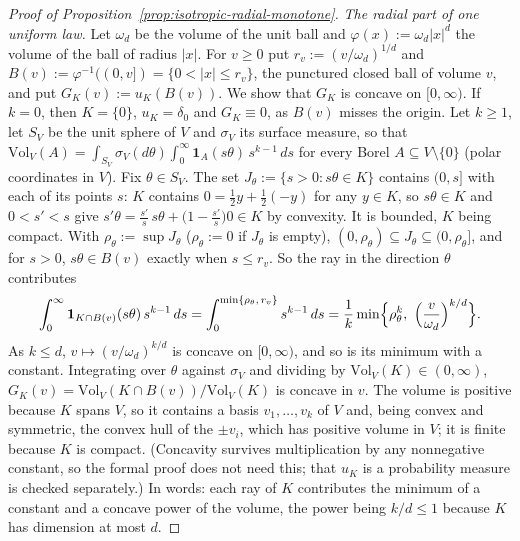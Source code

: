 \begin{proof}[Proof of Proposition~\ref{prop:isotropic-radial-monotone}]
\emph{The radial part of one uniform law.} Let $\omega_d$ be the volume of the unit ball and
$\varphi(x) := \omega_d|x|^d$ the volume of the ball of radius $|x|$. For $v \ge 0$ put
$r_v := (v/\omega_d)^{1/d}$ and $B(v) := \varphi^{-1}((0,v]) = \{0 < |x| \le r_v\}$, the
punctured closed ball of volume $v$, and put $G_K(v) := u_K(B(v))$. We show that $G_K$ is concave
on $[0,\infty)$. If $k = 0$, then $K = \{0\}$, $u_K = \delta_0$ and $G_K \equiv 0$, as $B(v)$
misses the origin. Let $k \ge 1$, let $S_V$ be the unit sphere of $V$ and $\sigma_V$ its surface
measure, so that $\mathrm{Vol}_V(A) = \int_{S_V}\sigma_V(d\theta)\int_0^\infty
\mathbf{1}_A(s\theta)\,s^{k-1}\,ds$ for every Borel $A \subseteq V \setminus \{0\}$ (polar
coordinates in $V$). Fix $\theta \in S_V$. The set $J_\theta := \{s > 0 : s\theta \in K\}$ contains
$(0, s]$ with each of its points $s$: $K$ contains $0 = \tfrac12 y + \tfrac12(-y)$ for any
$y \in K$, so $s\theta \in K$ and $0 < s' < s$ give
$s'\theta = \tfrac{s'}{s}\,s\theta + \bigl(1 - \tfrac{s'}{s}\bigr)0 \in K$ by convexity. It is
bounded, $K$ being compact. With $\rho_\theta := \sup J_\theta$ ($\rho_\theta := 0$ if
$J_\theta$ is empty), $(0,\rho_\theta) \subseteq J_\theta \subseteq (0,\rho_\theta]$, and for
$s > 0$, $s\theta \in B(v)$ exactly when $s \le r_v$. So the ray in the direction $\theta$
contributes
\[
  \int_0^\infty\mathbf{1}_{K \cap B(v)}(s\theta)\,s^{k-1}\,ds
   = \int_0^{\min\{\rho_\theta,\,r_v\}}s^{k-1}\,ds
   = \frac1k\min\Bigl\{\rho_\theta^k,\ \Bigl(\frac{v}{\omega_d}\Bigr)^{k/d}\Bigr\} .
\]
As $k \le d$, $v \mapsto (v/\omega_d)^{k/d}$ is concave on $[0,\infty)$, and so is its minimum with
a constant. Integrating over $\theta$ against $\sigma_V$ and dividing by
$\mathrm{Vol}_V(K) \in (0,\infty)$, $G_K(v) = \mathrm{Vol}_V(K \cap B(v))/\mathrm{Vol}_V(K)$ is
concave in $v$. The volume is positive because $K$ spans $V$, so it contains a basis
$v_1,\dots,v_k$ of $V$ and, being convex and symmetric, the convex hull of the $\pm v_i$, which has
positive volume in $V$; it is finite because $K$ is compact. (Concavity survives multiplication by
any nonnegative constant, so the formal proof does not need this; that $u_K$ is a probability
measure is checked separately.) In words: each ray of $K$ contributes the minimum of a constant and
a concave power of the volume, the power being $k/d \le 1$ because $K$ has dimension at most $d$.


\end{proof}
